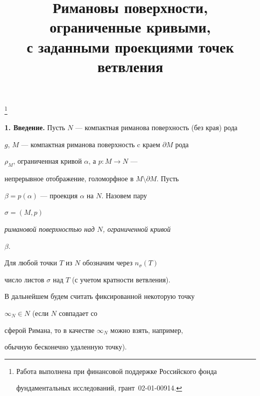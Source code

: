 

\title{Римановы поверхности, ограниченные кривыми,\\


с заданными проекциями точек ветвления}


\thanks{Работа выполнена при финансовой поддержке Российского фонда


фундаментальных исследований, грант \No\,02-01-00914.}





\date{}




\pagestyle{plain} %







\maketitle


\label{begin}








{\bf 1. Введение.} Пусть $N$ --- компактная риманова поверхность (без края) рода


$g$, $M$ --- компактная риманова поверхность c краем $\partial M$ рода


$\rho_M$, ограниченная кривой $\alpha$, а $p:M\to N$ ---


непрерывное отображение, голоморфное в $M\setminus\partial M$. Пусть


$\beta=p(\alpha)$ --- проекция $\alpha$ на $N$. Назовем пару


$\sigma=(M,p)$ {\it римановой поверхностью над $N$, ограниченной кривой


$\beta$.} Для любой точки $T$ из $N$ обозначим через $n_\sigma(T)$ 


число листов $\sigma$ над $T$ (с учетом кратности ветвления).


В дальнейшем будем считать фиксированной некоторую точку


$\infty_N\in N$ (если $N$ совпадает со


сферой Римана, то в качестве $\infty_N$ можно взять, например,


обычную бесконечно удаленную точку).





